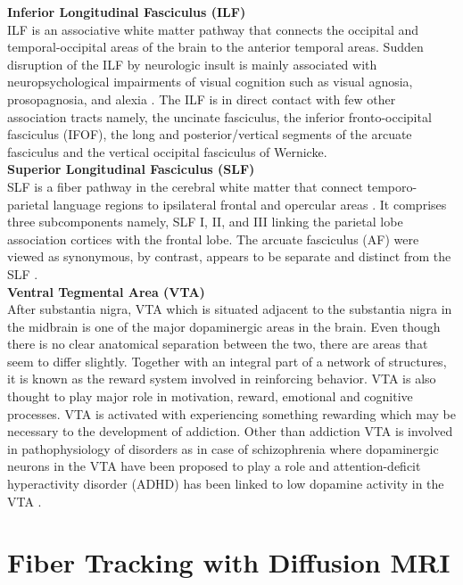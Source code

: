 \documentclass[../structure.tex]{subfiles}
\begin{document}
				
		\textbf{Inferior Longitudinal Fasciculus (ILF)}\\		
		ILF is an associative white matter pathway that connects the occipital and temporal-occipital areas of the brain to the anterior temporal areas.  Sudden disruption of the ILF by neurologic insult is mainly associated with  neuropsychological impairments of visual cognition such as visual agnosia, prosopagnosia, and alexia \cite{Herbet2018}. The ILF is in direct contact with few other association tracts namely, the uncinate fasciculus, the inferior fronto-occipital fasciculus (IFOF), the long and posterior/vertical segments of the arcuate fasciculus and the vertical occipital fasciculus of Wernicke.\\

		

		\textbf{Superior Longitudinal Fasciculus (SLF)}\\			
		SLF is a fiber pathway in the cerebral white matter that connect temporo-parietal language regions to ipsilateral frontal and opercular areas \cite{Madhavan2014}. It comprises three subcomponents namely, SLF I, II, and III linking the parietal lobe association cortices with the frontal lobe. The arcuate fasciculus (AF) were viewed as synonymous, by contrast, appears to be separate and distinct from the SLF \cite{Schmahmann2006}.\\
		
		
		\textbf{Ventral Tegmental Area (VTA)}\\
		After substantia nigra, VTA which is situated adjacent to the substantia nigra in the midbrain is one of the major dopaminergic areas in the brain. Even though there is no clear anatomical separation between the two, there are areas that seem to differ slightly. Together with an integral part of a network of structures, it is known as the reward system involved in reinforcing behavior. VTA is also thought to play major role in motivation, reward, emotional and cognitive processes. VTA is activated with experiencing something rewarding which may be necessary to the development of addiction. Other than addiction VTA is involved in pathophysiology of disorders as in case of schizophrenia where dopaminergic neurons in the VTA have been proposed to play a role and attention-deficit hyperactivity disorder (ADHD) has been linked to low dopamine activity in the VTA \cite{Kalivas1993}.\\
	
\section{Fiber Tracking with Diffusion MRI}
\end{document}
